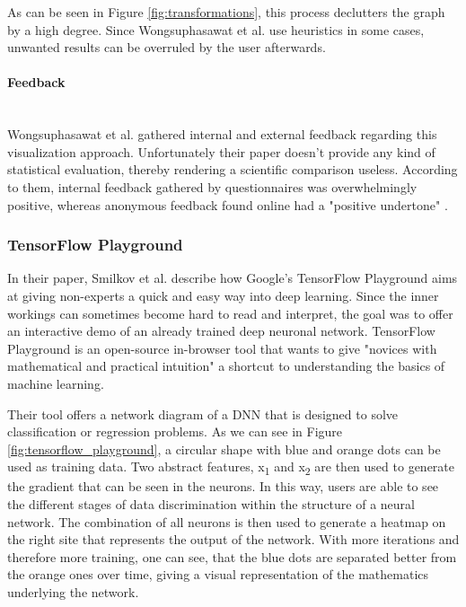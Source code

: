 \documentclass{acmsiggraph}               %
\newcommand{\paragraphbr}[1]{\paragraph{#1}\mbox{}\\}
\begin{document}
As can be seen in Figure \ref{fig:transformations}, this process declutters the graph by a high degree. Since Wongsuphasawat et al. use heuristics in some cases, unwanted results can be overruled by the user afterwards.

\paragraphbr{Feedback}

Wongsuphasawat et al. gathered internal and external feedback regarding this visualization approach. Unfortunately their paper doesn't provide any kind of statistical evaluation, thereby rendering a scientific comparison useless. According to them, internal feedback gathered by questionnaires was overwhelmingly positive, whereas anonymous feedback found online had a "positive undertone" \cite[p.~9]{Wongsuphasawat2018}.

\subsubsection{TensorFlow Playground}

In their paper, Smilkov et al. describe how Google's TensorFlow Playground aims at giving non-experts a quick and easy way into deep learning. Since the inner workings can sometimes become hard to read and interpret, the goal was to offer an interactive demo of an already trained deep neuronal network. TensorFlow Playground is an open-source in-browser tool that wants to give "novices with mathematical and practical intuition" \cite[p.~1]{Smilkov2017} a shortcut to understanding the basics of machine learning.

Their tool offers a network diagram of a DNN that is designed to solve classification or regression problems. As we can see in Figure \ref{fig:tensorflow_playground}, a circular shape with blue and orange dots can be used as training data. Two abstract features, x\textsubscript{1} and x\textsubscript{2} are then used to generate the gradient that can be seen in the neurons. In this way, users are able to see the different stages of data discrimination within the structure of a neural network. The combination of all neurons is then used to generate a heatmap on the right site that represents the output of the network. With more iterations and therefore more training, one can see, that the blue dots are separated better from the orange ones over time, giving a visual representation of the mathematics underlying the network.
\end{document}

